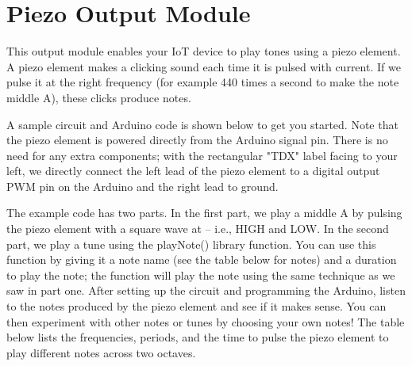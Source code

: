 
\clearpage
\section{Piezo Output Module}
\label{sec-output-piezo}

This output module enables your IoT device to play tones using a piezo
element. A piezo element makes a clicking sound each time it is pulsed
with current. If we pulse it at the right frequency (for example 440
times a second to make the note middle A), these clicks produce notes.

A sample circuit and Arduino code is shown below to get you started.
Note that the piezo element is powered directly from the Arduino signal
pin. There is no need for any extra components; with the rectangular
"TDX" label facing to your left, we directly connect the left lead of the
piezo element to a digital output PWM pin on the Arduino and the right
lead to ground.

The example code has two parts. In the first part, we play a middle A by
pulsing the piezo element with a square wave at  -- i.e.,
 HIGH and  LOW. In the second
part, we play a tune using the playNote() library function. You can use
this function by giving it a note name (see the table below for notes)
and a duration to play the note; the function will play the note using
the same technique as we saw in part one. After setting up the circuit
and programming the Arduino, listen to the notes produced by the piezo
element and see if it makes sense. You can then experiment with other
notes or tunes by choosing your own notes! The table below lists the
frequencies, periods, and the time to pulse the piezo element to play
different notes across two octaves.


